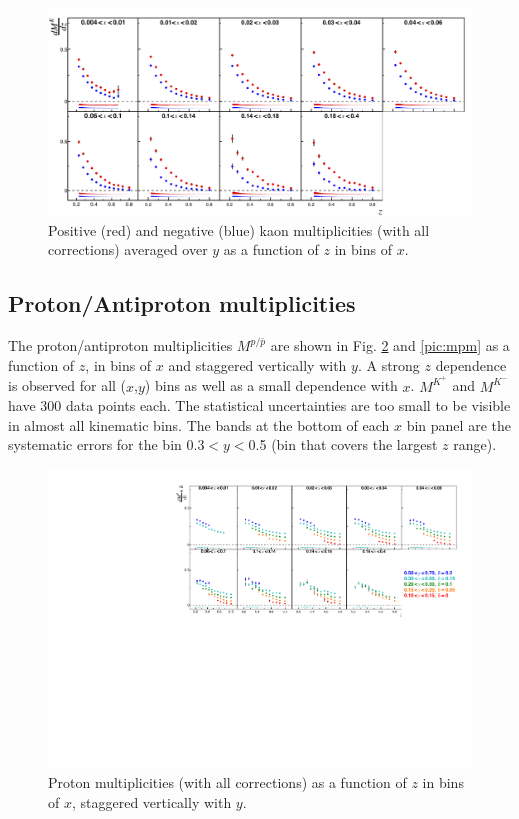 \begin{figure}[!h]
  \centering
	\includegraphics[scale=0.85]{./gfx/Kyavg.png}
	\caption{Positive (red) and negative (blue) kaon multiplicities (with all corrections) averaged over $y$ as a function of $z$ in bins of $x$.}
	\label{pic:mkyavg}
\end{figure}

\newpage

\subsection{Proton/Antiproton multiplicities}

The proton/antiproton multiplicities $M^{p/\bar{p}}$ are shown in Fig. \ref{pic:mpp} and \ref{pic:mpm} as a function of $z$, in bins of $x$ and staggered vertically with $y$. A strong $z$ dependence is observed for all ($x$,$y$) bins as well as a small dependence with $x$. $M^{K^+}$ and $M^{K^-}$ have 300 data points each. The statistical uncertainties are too small to be visible in almost all kinematic bins. The bands at the bottom of each $x$ bin panel are the systematic errors for the bin 0.3$< y <$0.5 (bin that covers the largest $z$ range).

\begin{figure}[!h]
  \centering
	\includegraphics[scale=0.85]{./gfx/pp.pdf}
	\caption{Proton multiplicities (with all corrections) as a function of $z$ in bins of $x$, staggered vertically with $y$.}
	\label{pic:mpp}
\end{figure}

